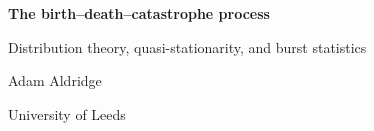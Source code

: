 \documentclass[11pt]{report}
\begin{document}
\hypersetup{pageanchor=false}
\begin{titlepage}
\centering
\vspace*{4cm}
{\LARGE\bfseries The birth--death--catastrophe process\par}
\vspace{6pt}
{\large Distribution theory, quasi-stationarity, and burst statistics\par}
\vspace{2.5cm}
{\large Adam Aldridge\par}
\vspace{4pt}
{University of Leeds\par}
\end{titlepage}
\hypersetup{pageanchor=true}

\tableofcontents
\clearpage

\setcounter{chapter}{4}   %


\FloatBarrier
\begingroup
\footnotesize


\endgroup
\end{document}
